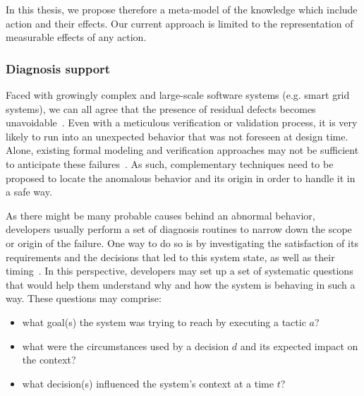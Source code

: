 In this thesis, we propose therefore a meta-model of the knowledge which include action and their effects.
Our current approach is limited to the representation of measurable effects of any action.


\subsubsection{Diagnosis support}

Faced with growingly complex and large-scale software systems (e.g. smart grid systems), we can all agree that the presence of residual defects becomes unavoidable~\cite{DBLP:conf/icse/BarbosaLMJ17, DBLP:conf/icse/MongielloPS15, DBLP:conf/icse/HassanBB15}. 
Even with a meticulous verification or validation process, it is very likely to run into an unexpected behavior that was not foreseen at design time. Alone, existing formal modeling and verification approaches may not be sufficient to anticipate these failures~\cite{DBLP:conf/icse/TaharaOH17}. 
As such, complementary techniques need to be proposed to locate the anomalous behavior and its origin in order to handle it in a safe way.

As there might be many probable causes behind an abnormal behavior, developers usually perform a set of diagnosis routines to narrow down the scope or origin of the failure. One way to do so is by investigating the satisfaction of its requirements and the decisions that led to this system state, as well as their timing~\cite{DBLP:conf/iceccs/BencomoWSW12}.  
In this perspective, developers may set up a set of systematic questions that would help them understand why and how the system is behaving in such a way.
These questions may comprise: 
\begin{itemize}
   \item what goal(s) the system was trying to reach by executing a tactic $a$? 
   \item what were the circumstances used by a decision $d$ and its expected impact on the context?
   \item what decision(s) influenced the system's context at a time $t$? 
\end{itemize}

